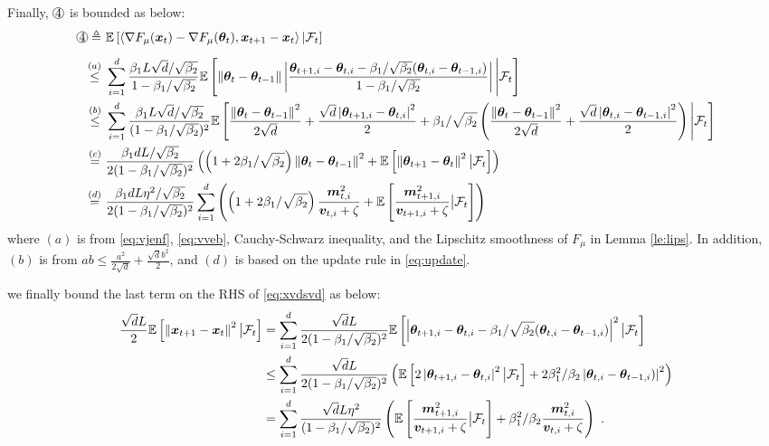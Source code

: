 \begin{appendices}
Finally, $\circled{4}$ is bounded as below:
\begin{equation}
\begin{aligned}
\circled{4}\triangleq\,\,&\E\left[\left\langle\nabla F_{\mu}(\vx_t) - \nabla F_{\mu}(\vtheta_t), \vx_{t+1} - \vx_{t}\right\rangle | \gF_t \right] \\[5pt]
\stackrel{(a)}{\leq}\,\,& \sum_{i=1}^d\frac{\beta_1 L\sqrt{d}/\sqrt{\beta_2}}{1 - \beta_1/\sqrt{\beta_2}}\E\left[\left\|\vtheta_{t} - \vtheta_{t-1}\right\|\left|\frac{\vtheta_{t+1,i} - \vtheta_{t,i} - \beta_1/\sqrt{\beta_2}(\vtheta_{t,i} - \vtheta_{t-1,i})}{1-\beta_1/\sqrt{\beta_2}}\right| \Bigg| \gF_t \right]  \\
\stackrel{(b)}{\leq}\,\,& \sum_{i=1}^d\frac{\beta_1L\sqrt{d}/\sqrt{\beta_2}}{(1 - \beta_1/\sqrt{\beta_2})^2}\E\left[\frac{\left\|\vtheta_{t} - \vtheta_{t-1}\right\|^2}{2\sqrt{d}} + \frac{\sqrt{d}\left|\vtheta_{t+1,i} - \vtheta_{t,i}\right|^2}{2} + \beta_1/\sqrt{\beta_2}\left(\frac{\left\|\vtheta_{t} - \vtheta_{t-1}\right\|^2}{2\sqrt{d}} + \frac{\sqrt{d}\left|\vtheta_{t,i} - \vtheta_{t-1,i}\right|^2}{2}\right)\Bigg| \gF_t\right] \\
\stackrel{(c)}{=}\,\,& \frac{\beta_1 dL /\sqrt{\beta_2}}{2(1 - \beta_1/\sqrt{\beta_2})^2}\left(\left(1 + 2\beta_1/\sqrt{\beta_2}\right)\left\|\vtheta_{t} - \vtheta_{t-1}\right\|^2 + \E\left[\left\|\vtheta_{t+1} - \vtheta_{t}\right\|^2 \big| \gF_t\right] \right) \\
\stackrel{(d)}{=}\,\,& \frac{\beta_1 dL \eta^2/\sqrt{\beta_2}}{2(1 - \beta_1/\sqrt{\beta_2})^2}\sum_{i=1}^d\left(\left(1 + 2\beta_1/\sqrt{\beta_2}\right)\frac{\vm_{t,i}^2}{\vv_{t,i}+\zeta} + \E\left[\frac{\vm_{t+1,i}^2}{\vv_{t+1,i}+\zeta}\big| \gF_t\right]\right) \label{eq:cir-4}
\end{aligned}
\end{equation}
where $(a)$ is from \eqref{eq:vjenf}, \eqref{eq:vveb}, Cauchy-Schwarz inequality, and the Lipschitz smoothness of $F_{\mu}$ in Lemma \ref{le:lips}. In addition, $(b)$ is from $ab \leq \frac{a^2}{2\sqrt{d}} + \frac{\sqrt{d}b^2}{2}$, and $(d)$ is based on the update rule in \eqref{eq:update}.

we finally bound the last term on the RHS of \eqref{eq:xvdsvd} as below:
\begin{equation}
\begin{aligned}
\frac{\sqrt{d}L}{2}\mathbb{E}\left[\left\|{\bm{x}}_{t+1} - {\bm{x}}_{t}\right\|^2 \big| {\mathcal{F}}_t\right] &= \sum_{i=1}^d\frac{\sqrt{d}L}{2(1-\beta_1/\sqrt{\beta_2})^2}\mathbb{E}\left[\left|{\bm{\theta}}_{t+1,i} - {\bm{\theta}}_{t,i} - \beta_1/\sqrt{\beta_2}({\bm{\theta}}_{t,i} - {\bm{\theta}}_{t-1,i})\right|^2 \big| {\mathcal{F}}_t\right] \\
&\leq\sum_{i=1}^d\frac{\sqrt{d}L}{2(1-\beta_1/\sqrt{\beta_2})^2}\left(\mathbb{E}\left[2\left|{\bm{\theta}}_{t+1,i} - {\bm{\theta}}_{t,i}\right|^2\big| {\mathcal{F}}_t\right] + 2\beta^2_1/\beta_2\left|{\bm{\theta}}_{t,i} - {\bm{\theta}}_{t-1,i})\right|^2\right) \\
&=\sum_{i=1}^d\frac{\sqrt{d}L\eta^2}{(1-\beta_1/\sqrt{\beta_2})^2}\left(\mathbb{E}\left[\frac{{\bm{m}}_{t+1,i}^2}{{\bm{v}}_{t+1,i}+\zeta}\big| {\mathcal{F}}_t\right] + \beta^2_1/\beta_2\frac{{\bm{m}}_{t,i}^2}{{\bm{v}}_{t,i}+\zeta}\right) \ . \label{eq:last-rhs}
\end{aligned}
\end{equation}


\end{appendices}
